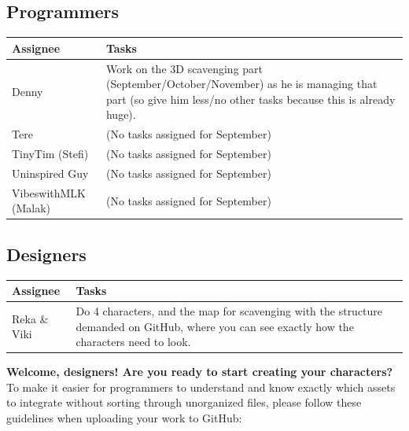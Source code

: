 \documentclass[11pt,a4paper]{article}
\begin{document}
\subsection*{Programmers}
\begin{tabularx}{\textwidth}{@{} l X @{}}
\toprule
\textbf{Assignee} & \textbf{Tasks} \\
\midrule
Denny & Work on the 3D scavenging part (September/October/November) as he is managing that part (so give him less/no other tasks because this is already huge). \\
\midrule
Tere & (No tasks assigned for September) \\
\midrule
TinyTim (Stefi) & (No tasks assigned for September) \\
\midrule
Uninspired Guy & (No tasks assigned for September) \\
\midrule
VibeswithMLK (Malak) & (No tasks assigned for September) \\
\bottomrule
\end{tabularx}

\newpage
\subsection*{Designers}
\begin{tabularx}{\textwidth}{@{} l X @{}}
\toprule
\textbf{Assignee} & \textbf{Tasks} \\
\midrule
Reka \& Viki & Do 4 characters, and the map for scavenging with the structure demanded on GitHub, where you can see exactly how the characters need to look. \\
\bottomrule
\end{tabularx}

\vspace{0.5cm}
\noindent\textbf{Welcome, designers! Are you ready to start creating your characters?} \\
To make it easier for programmers to understand and know exactly which assets to integrate without sorting through unorganized files, please follow these guidelines when uploading your work to GitHub:
\end{document}
